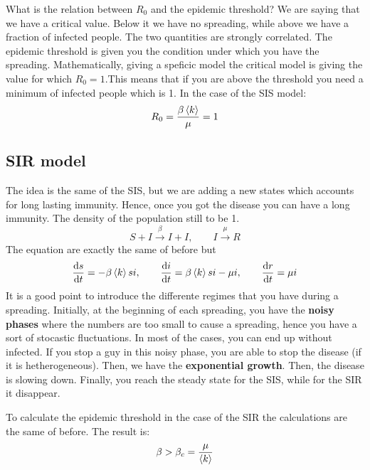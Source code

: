 \documentclass[../main/main.tex]{subfiles}
\begin{document}
What is the relation between \( R_0 \) and the epidemic threshold? We are saying that we have a critical value. Below it we have no spreading, while above we have a fraction of infected people. The two quantities are strongly correlated.
The epidemic threshold is given you the condition under which you have the spreading. Mathematically, giving a speficic model the critical model is giving the value for which \( R_0=1 \).This means that if you are above the threshold you need a minimum of infected people which is 1.  In the case of the SIS model:
\begin{equation*}
  R_0 = \frac{\beta \expval{k} }{\mu } = 1
\end{equation*}


\subsection{SIR model}
The idea is the same of the SIS, but we are adding a new states which accounts for long lasting immunity. Hence, once you got the disease you can have a long immunity. The density of the population still to be 1.
\begin{equation*}
  S + I \overset{\beta }{\rightarrow } I + I, \qquad I \overset{\mu }{\rightarrow } R
\end{equation*}
The equation are exactly the same of before but
\begin{equation*}
  \dv{s}{t} = - \beta \expval{k} si, \qquad \dv{i}{t} = \beta \expval{k} si - \mu i, \qquad  \dv{r}{t} = \mu i
\end{equation*}
It is a good point to introduce the differente regimes that you have during a spreading. Initially, at the beginning of each spreading, you have the \textbf{noisy phases} where the numbers are too small to cause a spreading, hence you have a sort of stocastic fluctuations. In most of the cases, you can end up without infected. If you stop a guy in this noisy phase, you are able to stop the disease (if it is hetherogeneous). Then, we have the \textbf{exponential growth}. Then, the disease is slowing down. Finally, you reach the steady state for the SIS, while for the SIR it disappear.

To calculate the epidemic threshold in the case of the SIR the calculations are the same of before. The result is:
\begin{equation*}
  \beta > \beta _c = \frac{\mu }{\expval{k} }
\end{equation*}
\end{document}
